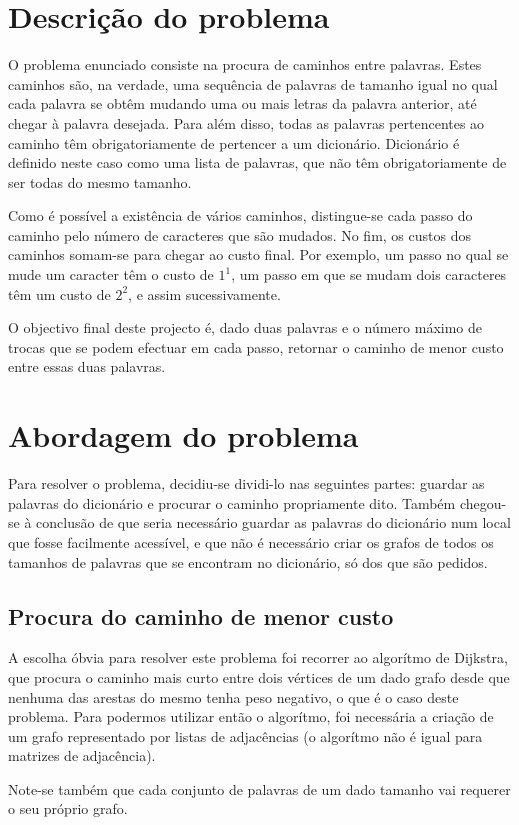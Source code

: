 \documentclass[a4paper, 11pt]{article}
\begin{document}


\pagestyle{fancy}
\tableofcontents
\newpage

\section{Descrição do problema}
    \par O problema enunciado consiste na procura de caminhos entre palavras. Estes caminhos são, na verdade, uma sequência de palavras de tamanho igual no qual cada palavra se obtêm mudando uma ou mais letras da palavra anterior, até chegar à palavra desejada. Para além disso, todas as palavras pertencentes ao caminho têm obrigatoriamente de pertencer a um dicionário. Dicionário é definido neste caso como uma lista de palavras, que não têm obrigatoriamente de ser todas do mesmo tamanho.
    \par Como é possível a existência de vários caminhos, distingue-se cada passo do caminho pelo número de caracteres que são mudados. No fim, os custos dos caminhos somam-se para chegar ao custo final. Por exemplo, um passo no qual se mude um caracter têm o custo de $1^1$, um passo em que se mudam dois caracteres têm um custo de $2^2$, e assim sucessivamente.
    \par O objectivo final deste projecto é, dado duas palavras e o número máximo de trocas que se podem efectuar em cada passo, retornar o caminho de menor custo entre essas duas palavras.
    
\section{Abordagem do problema}
    \par Para resolver o problema, decidiu-se dividi-lo nas seguintes partes: guardar as palavras do dicionário e procurar o caminho propriamente dito. Também chegou-se à conclusão de que seria necessário guardar as palavras do dicionário num local que fosse facilmente acessível, e que não é necessário criar os grafos de todos os tamanhos de palavras que se encontram no dicionário, só dos que são pedidos.
\subsection{Procura do caminho de menor custo}
    \par A escolha óbvia para resolver este problema foi recorrer ao algorítmo de Dijkstra, que procura o caminho mais curto entre dois vértices de um dado grafo desde que nenhuma das arestas do mesmo tenha peso negativo, o que é o caso deste problema. Para podermos utilizar então o algorítmo, foi necessária a criação de um grafo representado por listas de adjacências (o algorítmo não é igual para matrizes de adjacência).
    \par Note-se também que cada conjunto de palavras de um dado tamanho vai requerer o seu próprio grafo.
    
\end{document}
